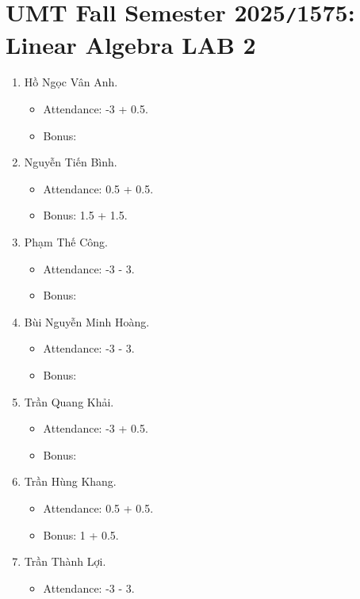 \documentclass{article}
\begin{document}

\section{UMT Fall Semester 2025{\tt/}1575: Linear Algebra LAB 2}

\begin{enumerate}
    \item {\sc Hồ Ngọc Vân Anh.}
    \begin{itemize}
        \item Attendance: -3 + 0.5.
        \item Bonus:
    \end{itemize}
    \item {\sc Nguyễn Tiến Bình.}
    \begin{itemize}
        \item Attendance: 0.5 + 0.5.
        \item Bonus: 1.5 + 1.5.
    \end{itemize}
    \item {\sc Phạm Thế Công.}
    \begin{itemize}
        \item Attendance: -3 - 3.
        \item Bonus:
    \end{itemize}
    \item {\sc Bùi Nguyễn Minh Hoàng.}
    \begin{itemize}
        \item Attendance: -3 - 3.
        \item Bonus:
    \end{itemize}
    \item {\sc Trần Quang Khải.}
    \begin{itemize}
        \item Attendance: -3 + 0.5.
        \item Bonus:
    \end{itemize}
    \item {\sc Trần Hùng Khang.}
    \begin{itemize}
        \item Attendance: 0.5 + 0.5.
        \item Bonus: 1 + 0.5.
    \end{itemize}
    \item {\sc Trần Thành Lợi.}
    \begin{itemize}
        \item Attendance: -3 - 3.

\end{itemize}
\end{enumerate}
\end{document}
